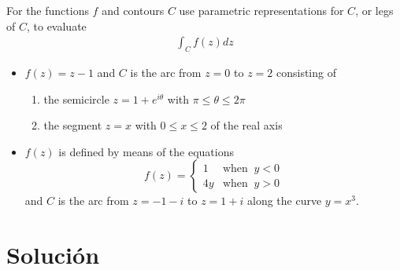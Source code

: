 \begin{problem}{1}
For the functions $f$ and contours $C$ use parametric representations for $C$, or legs of $C$, to evaluate
\begin{gather*}
    \int_C f(z)dz
\end{gather*}

\begin{itemize}
    \item $f(z) = z - 1$  and $C$ is the arc from $z = 0$ to $z = 2$ consisting of 
    \begin{enumerate}
        \item the semicircle $z = 1 + e^{i\theta}$ with $\pi \leq \theta \leq 2\pi$
        \item the segment $z = x$  with $0 \leq x \leq 2$ of the real axis
    \end{enumerate}
    \item $f(z)$ is defined by means of the equations
    \begin{equation*}
        f(z) = \left\{\begin{matrix}
            1 & \text{when} \;\; y < 0\\ 
            4y& \text{when} \;\; y >0
           \end{matrix}\right.
    \end{equation*}
    and $C$ is the arc from $z = -1 - i$ to $z = 1 + i$ along the curve $y = x^3$.
\end{itemize}    
\end{problem}

\section*{Solución}


